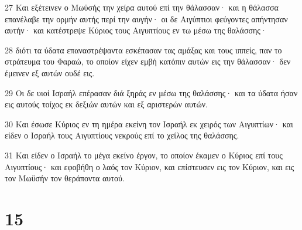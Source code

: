 \par 27 Και εξέτεινεν ο Μωϋσής την χείρα αυτού επί την θάλασσαν· και η θάλασσα επανέλαβε την ορμήν αυτής περί την αυγήν· οι δε Αιγύπτιοι φεύγοντες απήντησαν αυτήν· και κατέστρεψε Κύριος τους Αιγυπτίους εν τω μέσω της θαλάσσης·
\par 28 διότι τα ύδατα επαναστρέψαντα εσκέπασαν τας αμάξας και τους ιππείς, παν το στράτευμα του Φαραώ, το οποίον είχεν εμβή κατόπιν αυτών εις την θάλασσαν· δεν έμεινεν εξ αυτών ουδέ εις.
\par 29 Οι δε υιοί Ισραήλ επέρασαν διά ξηράς εν μέσω της θαλάσσης· και τα ύδατα ήσαν εις αυτούς τοίχος εκ δεξιών αυτών και εξ αριστερών αυτών.
\par 30 Και έσωσε Κύριος εν τη ημέρα εκείνη τον Ισραήλ εκ χειρός των Αιγυπτίων· και είδεν ο Ισραήλ τους Αιγυπτίους νεκρούς επί το χείλος της θαλάσσης.
\par 31 Και είδεν ο Ισραήλ το μέγα εκείνο έργον, το οποίον έκαμεν ο Κύριος επί τους Αιγυπτίους· και εφοβήθη ο λαός τον Κύριον, και επίστευσεν εις τον Κύριον, και εις τον Μωϋσήν τον θεράποντα αυτού.

\chapter{15}

